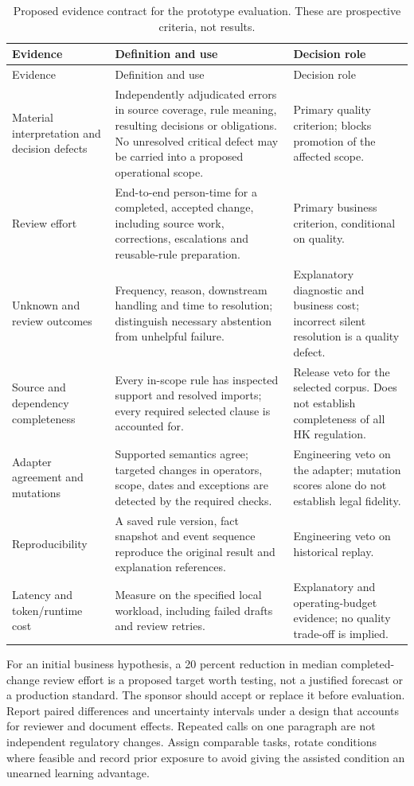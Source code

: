 \begingroup\small
\begin{longtable}{P{0.25\textwidth}P{0.39\textwidth}P{0.26\textwidth}}
\caption{Proposed evidence contract for the prototype evaluation. These are
prospective criteria, not results.}\label{tab:evaluation}\\
\toprule Evidence & Definition and use & Decision role \\\midrule
\endfirsthead
\toprule Evidence & Definition and use & Decision role \\\midrule
\endhead
Material interpretation and decision defects & Independently adjudicated errors
in source coverage, rule meaning, resulting decisions or obligations. No unresolved
critical defect may be carried into a proposed operational scope. & Primary quality
criterion; blocks promotion of the affected scope.\\
Review effort & End-to-end person-time for a completed, accepted change, including
source work, corrections, escalations and reusable-rule preparation. & Primary
business criterion, conditional on quality.\\
Unknown and review outcomes & Frequency, reason, downstream handling and time to
resolution; distinguish necessary abstention from unhelpful failure. & Explanatory
diagnostic and business cost; incorrect silent resolution is a quality defect.\\
Source and dependency completeness & Every in-scope rule has inspected support and
resolved imports; every required selected clause is accounted for. & Release veto
for the selected corpus. Does not establish completeness of all HK regulation.\\
Adapter agreement and mutations & Supported semantics agree; targeted changes in
operators, scope, dates and exceptions are detected by the required checks. &
Engineering veto on the adapter; mutation scores alone do not establish legal fidelity.\\
Reproducibility & A saved rule version, fact snapshot and event sequence reproduce
the original result and explanation references. & Engineering veto on historical replay.\\
Latency and token/runtime cost & Measure on the specified local workload, including
failed drafts and review retries. & Explanatory and operating-budget evidence; no
quality trade-off is implied.\\
\bottomrule
\end{longtable}
\endgroup

For an initial business hypothesis, a 20 percent reduction in median completed-change
review effort is a proposed target worth testing, not a justified forecast or a
production standard. The sponsor should accept or replace it before evaluation.
Report paired differences and uncertainty intervals under a design that accounts
for reviewer and document effects. Repeated calls on one paragraph are not
independent regulatory changes. Assign comparable tasks, rotate conditions where
feasible and record prior exposure to avoid giving the assisted condition an
unearned learning advantage.

